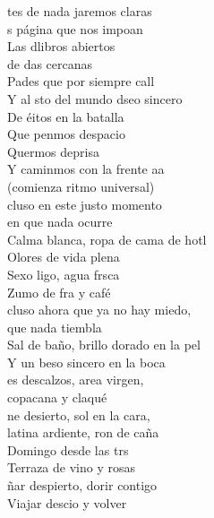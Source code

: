 \begin{cancion}%
	tes de nada jaremos claras\\
	s página que nos impoan\\
	Las dlibros abiertos \\
	de das cercanas\\
	Pades que por siempre call\\
	Y al sto del mundo dseo sincero\\
	De éitos en la batalla \\
	Que penmos despacio\\
	Quermos deprisa\\
	Y caminmos con la frente aa\\
(comienza ritmo universal)\\
\jump
	cluso en este justo momento \\
en que nada ocurre\\
	Calma blanca, ropa de cama de hotl\\
Olores de vida plena\\
	Sexo ligo, agua frsca\\
	Zumo de fra y café\\
\jump
	cluso ahora que ya no hay miedo, \\
que nada tiembla\\
	Sal de baño, brillo dorado en la pel\\
Y un beso sincero en la boca\\
	es descalzos, area virgen, \\
	copacana y claqué\\
\jump
	ne desierto, sol en la cara, \\
latina ardiente, ron de caña\\
	Domingo desde las trs\\
Terraza de vino y rosas\\
	ñar despierto, dorir contigo\\
	Viajar descio y volver\\\jump\\
	\begin{chorus}%

\end{chorus}
\end{cancion}
